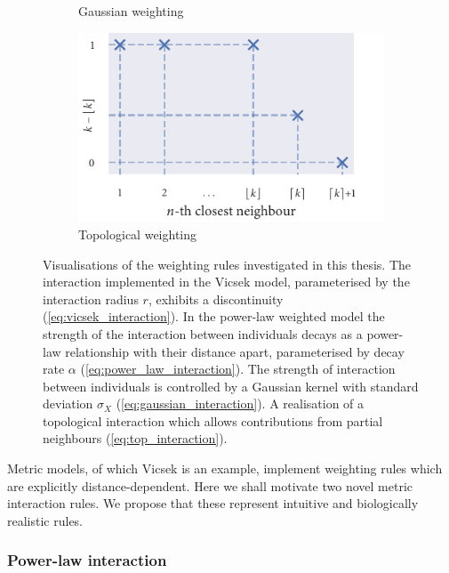 \begin{figure}[tb]
\begin{subfigure}[b]{0.5\textwidth}
    \caption{Gaussian weighting}
    \label{fig:gauss_weight}
  \end{subfigure}%
  \begin{subfigure}[b]{0.5\textwidth}
    \includegraphics{topological_weighting.pdf}
    \caption{Topological weighting}
    \label{fig:top_weight}
  \end{subfigure}
  \caption{Visualisations of the weighting rules investigated in this thesis.
     The interaction implemented in the Vicsek model,
    parameterised by the interaction radius $r$, exhibits a discontinuity
    (\cref{eq:vicsek_interaction}).
     In the power-law weighted model the strength of
    the interaction between individuals decays as a power-law relationship with
    their distance apart, parameterised by decay rate $\alpha$
    (\cref{eq:power_law_interaction}).
     The
    strength of interaction between individuals is controlled by a Gaussian
    kernel with standard deviation $\sigma_X$
    (\cref{eq:gaussian_interaction}).
     A realisation of
    a topological interaction which allows contributions from partial neighbours
    (\cref{eq:top_interaction}).}
  \label{fig:weighting_rules}
\end{figure}

Metric models, of which Vicsek is an example, implement weighting rules which
are explicitly distance-dependent. Here we shall motivate two novel metric
interaction rules. We propose that these represent intuitive and biologically
realistic rules.

\subsubsection{Power-law interaction}

